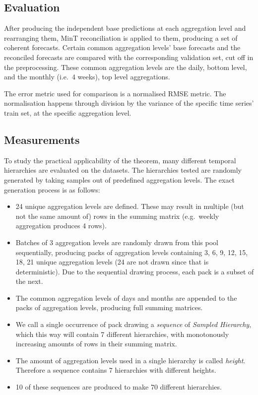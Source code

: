 \documentclass[sn-basic,Numbered,iicol]{sn-jnl}
\theoremstyle{thmstyleone}%
\theoremstyle{thmstyletwo}%
\theoremstyle{thmstylethree}%
\begin{document}
\subsection{Evaluation}\label{subsec:evaluation}

After producing the independent base predictions at each aggregation level and rearranging them, MinT reconciliation is applied to them, producing a set of coherent forecasts. Certain common aggregation levels' base forecasts and the reconciled forecasts are compared with the corresponding validation set, cut off in the preprocessing. These common aggregation levels are the daily, bottom level, and the monthly (i.e.\ 4 weeks), top level aggregations.

The error metric used for comparison is a normalised RMSE metric. The normalisation happens through division by the variance of the specific time series' train set, at the specific aggregation level.

\subsection{Measurements}\label{subsec:measurements}

To study the practical applicability of the theorem, many different temporal hierarchies are evaluated on the datasets. The hierarchies tested are randomly generated by taking samples out of predefined aggregation levels. The exact generation process is as follows:

\begin{itemize}
\item 24 unique aggregation levels are defined. These may result in multiple (but not the same amount of) rows in the summing matrix (e.g.\ weekly aggregation produces 4 rows).
\item Batches of 3 aggregation levels are randomly drawn from this pool sequentially, producing packs of aggregation levels containing 3, 6, 9, 12, 15, 18, 21 unique aggregation levels (24 are not drawn since that is deterministic). Due to the sequential drawing process, each pack is a subset of the next.
\item The common aggregation levels of days and months are appended to the packs of aggregation levels, producing full summing matrices.
\item We call a single occurrence of pack drawing a \textit{sequence} of \textit{Sampled Hierarchy}, which this way will contain 7 different hierarchies, with monotonously increasing amounts of rows in their summing matrix.
\item The amount of aggregation levels used in a single hierarchy is called \textit{height}. Therefore a sequence contains 7 hierarchies with different heights.
\item 10 of these sequences are produced to make 70 different hierarchies.
\end{itemize}
\end{document}
